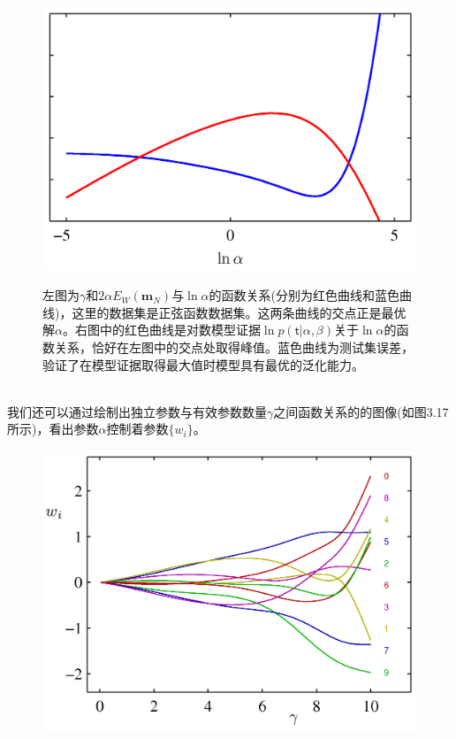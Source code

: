 \documentclass[b5paper]{book}
\numberwithin{equation}{chapter}
\newcommand {\sft} {\boldsymbol{\mathsf{t}}}
\begin{document}
{\begin{figure}[ht]
\begin{minipage}[t]{0.5\linewidth}
		\label{fig:3-16a}
		\end{minipage}
		\begin{minipage}[t]{0.5\linewidth}
		\centering
		\includegraphics[scale=0.8]{Images/3-16b.png}
		\label{fig:3-16b}
		\end{minipage}
		\caption{左图为$\gamma$和$2\alpha E_W(\mathbf{m}_N)$与$\ln \alpha$的函数关系(分别为红色曲线和蓝色曲线)，这里的数据集是正弦函数数据集。这两条曲线的交点正是最优解$\alpha$。右图中的红色曲线是对数模型证据$\ln p(\sft|\alpha,\beta)$关于$\ln \alpha$的函数关系，恰好在左图中的交点处取得峰值。蓝色曲线为测试集误差，验证了在模型证据取得最大值时模型具有最优的泛化能力。}
	\end{figure}
	\\
	\indent 我们还可以通过绘制出独立参数与有效参数数量$\gamma$之间函数关系的的图像(如图3.17所示)，看出参数$\alpha$控制着参数$\{w_i\}$。
	\begin{figure}[ht]
		\centering
		\includegraphics[scale=0.8]{Images/3-17.png}

\end{figure}}
\end{document}

